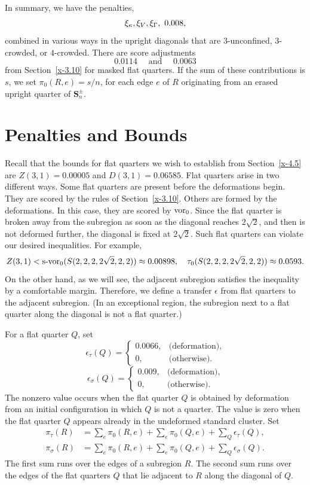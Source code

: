 In summary, we have the penalties,
    $$\xi_\kappa,\xi_V,\xi_\Gamma,\ 0.008,$$
combined in various ways in the upright diagonals that are
$3$-unconfined, $3$-crowded, or $4$-crowded.  There are score
adjustments
    $$0.0114\quad \text{ and }\quad 0.0063$$
from Section~\ref{x-3.10} for masked flat quarters.  If the sum of these
contributions is $s$, we set $\pi_0(R,e)=s/n$, for each edge $e$ of $R$
originating from an erased upright quarter of
    $\mathcal{\mathbf S}_n^\pm$.

\section{Penalties and Bounds}

Recall that the bounds for flat quarters we wish to establish from
Section~\ref{x-4.5} are $Z(3,1)=0.00005$ and $D(3,1)=0.06585$. Flat
quarters arise in two different ways.  Some flat quarters are present
before the deformations begin.  They are scored by the rules of
Section~\ref{x-3.10}. Others are formed by the deformations.  In this
case, they are scored by $\operatorname{vor}_0$. Since the flat quarter is broken away
from the subregion as soon as the diagonal reaches $2\sqrt{2}$, and then
is not deformed further, the diagonal is fixed at $2\sqrt{2}$.  Such
flat quarters can violate our desired inequalities. For example,
    $$
    Z(3,1)<\operatorname{s-vor}_0(S(2,2,2,2\sqrt{2},2,2)) \approx 0.00898,\quad
        \tau_0(S(2,2,2,2\sqrt{2},2,2))\approx 0.0593.
    $$
On the other hand, as we will see, the adjacent subregion satisfies the
inequality by a comfortable margin.  Therefore, we define a transfer
$\epsilon$ from flat quarters to the adjacent subregion. (In an
exceptional region, the subregion next to a flat quarter along the
diagonal is not a flat quarter.)

For a flat quarter $Q$, set
    $$
    \epsilon_\tau(Q) =
        \begin{cases} 0.0066,&\text{(deformation),}\\
            0,&\text{(otherwise)}.
        \end{cases}
    $$
    $$
    \epsilon_\sigma(Q) =
        \begin{cases}
         0.009,&\text{(deformation),}\\
            0,&\text{(otherwise)}.
        \end{cases}
    $$
The nonzero value occurs when the flat quarter $Q$ is obtained by
deformation from an initial configuration in which $Q$ is not a quarter.
The value is zero when the flat quarter $Q$ appears already in the
undeformed standard cluster. Set
    $$
    \begin{array}{lll}
    \pi_\tau(R) &= \sum_e \pi_0(R,e) +
    \sum_e\pi_0(Q,e)+\sum_Q \epsilon_\tau(Q),\\
    \pi_\sigma(R)&=\sum_e \pi_0(R,e) +
    \sum_e\pi_0(Q,e)+\sum_Q \epsilon_\sigma(Q).
    \end{array}
    $$
The first sum runs over the edges of a subregion $R$.  The second sum
runs over the edges of the flat quarters $Q$ that lie adjacent to $R$
along the diagonal of $Q$.

